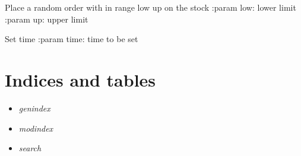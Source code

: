 \documentclass[letterpaper,10pt,english]{sphinxmanual}
\begin{document}
\begin{fulllineitems}
\begin{fulllineitems}
\label{virtualMarket:virtualMarket.virtualMarket.m_time}
\end{fulllineitems}


\begin{fulllineitems}
\label{virtualMarket:virtualMarket.virtualMarket.randomBet}
Place a random order with in range low up on the stock
:param low: lower limit
:param up: upper limit

\end{fulllineitems}


\begin{fulllineitems}
\label{virtualMarket:virtualMarket.virtualMarket.setTime}
Set time
:param time: time to be set

\end{fulllineitems}


\end{fulllineitems}



\chapter{Indices and tables}
\label{index:indices-and-tables}\begin{itemize}
\item {} 
\emph{genindex}

\item {} 
\emph{modindex}

\item {} 
\emph{search}

\end{itemize}
\end{document}
